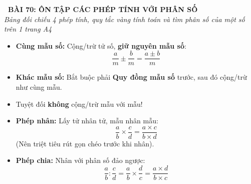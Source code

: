 \documentclass[14pt,a4paper,oneside]{extbook}
\begin{document}
\noindent
\begin{tcolorbox}[
  enhanced,
  colback=teal!8!white,
  colframe=teal!80!black,
  arc=3mm, boxrule=1pt,
  left=3mm, right=3mm, top=2mm, bottom=2mm,
  halign=center
]
  {\Large\bfseries\color{teal!90!black}\faBookmark\ BÀI 70: ÔN TẬP CÁC PHÉP TÍNH VỚI PHÂN SỐ}\\[1.5pt]
  {\footnotesize\itshape\color{black!75} Bảng đối chiếu 4 phép tính, quy tắc vàng tính toán và tìm phân số của một số trên 1 trang A4}
\end{tcolorbox}

\vspace{-2.5mm}

\noindent
\begin{minipage}[t]{0.49\textwidth}\vspace{0pt}
\begin{tcolorbox}[
  enhanced,
  colback=blue!4!white,
  colframe=blue!75!black,
  arc=2mm, boxrule=0.8pt,
  left=2mm, right=2mm, top=1.8mm, bottom=1.8mm,
  title={\footnotesize\bfseries\color{white}\faPlusSquare\ 1. Phép Cộng và Phép Trừ}
]
{\footnotesize
\begin{itemize}\setlength{\itemsep}{1pt}\setlength{\leftskip}{-2.5mm}
  \item \textbf{Cùng mẫu số:} Cộng/trừ tử số, \textbf{giữ nguyên mẫu số}:
  $$\dfrac{a}{m} \pm \dfrac{b}{m} = \dfrac{a \pm b}{m}$$
  \item \textbf{Khác mẫu số:} Bắt buộc phải \textbf{Quy đồng mẫu số} trước, sau đó cộng/trừ như cùng mẫu.
  \item Tuyệt đối \textbf{không} cộng/trừ mẫu với mẫu!
\end{itemize}
}
\end{tcolorbox}
\end{minipage}
\hfill
\begin{minipage}[t]{0.49\textwidth}\vspace{0pt}
\begin{tcolorbox}[
  enhanced,
  colback=teal!4!white,
  colframe=teal!75!black,
  arc=2mm, boxrule=0.8pt,
  left=2mm, right=2mm, top=1.8mm, bottom=1.8mm,
  title={\footnotesize\bfseries\color{white}\faTimesCircle\ 2. Phép Nhân và Phép Chia}
]
{\footnotesize
\begin{itemize}\setlength{\itemsep}{1pt}\setlength{\leftskip}{-2.5mm}
  \item \textbf{Phép nhân:} Lấy tử nhân tử, mẫu nhân mẫu:
  $$\dfrac{a}{b} \times \dfrac{c}{d} = \dfrac{a \times c}{b \times d}$$
  (Nên triệt tiêu rút gọn chéo trước khi nhân).
  \item \textbf{Phép chia:} Nhân với phân số đảo ngược:
  $$\dfrac{a}{b} : \dfrac{c}{d} = \dfrac{a}{b} \times \dfrac{d}{c} = \dfrac{a \times d}{b \times c}$$
\end{itemize}
}
\end{tcolorbox}
\end{minipage}
\end{document}
